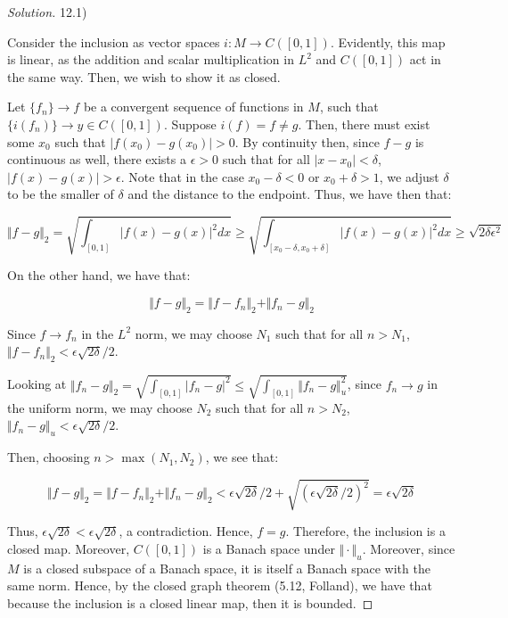 \documentclass[10pt]{article}
\begin{document}
\begin{proof}[Solution]

12.1)

Consider the inclusion as vector spaces $i: M \to C([0,1])$. Evidently, this map is linear, as the addition and scalar multiplication in $L^2$ and $C([0,1])$ act in the same way. Then, we wish to show it as closed.

Let $\{ f_n \} \to f$ be a convergent sequence of functions in $M$, such that $\{ i(f_n) \} \to y \in C([0,1])$. Suppose $i(f) = f \not = g$. Then, there must exist some $x_0$ such that $| f(x_0) - g(x_0) | > 0$. By continuity then, since $f - g$ is continuous as well, there exists a $\epsilon > 0$ such that for all $| x - x_0 | < \delta$, $|f(x) - g(x) | > \epsilon$. Note that in the case $x_0 - \delta < 0$ or $x_0 + \delta > 1$, we adjust $\delta$ to be the smaller of $\delta$ and the distance to the endpoint. Thus, we have then that:

$$ \Vert f - g \Vert_2  = \sqrt{\int_{[0,1]} | f(x) - g(x)|^2 dx} \geq \sqrt{ \int_{[x_0 - \delta, x_0 + \delta]} | f(x) - g(x) |^2 dx } \geq \sqrt{ 2 \delta \epsilon^2 } $$

On the other hand, we have that:

$$ \Vert f - g \Vert_2  = \Vert f - f_n \Vert_2 + \Vert f_n - g \Vert_2$$

Since $f \to f_n$ in the $L^2$ norm, we may choose $N_1$ such that for all $n > N_1$, $\Vert f - f_n\Vert_2 <  \epsilon\sqrt{2\delta}/2$.

Looking at $\Vert f_n - g \Vert_2 = \sqrt{\int_{[0,1]} | f_n - g |^2}  \leq \sqrt{\int_{[0,1]} \Vert f_n - g \Vert_u^2}$, since $f_n \to g$ in the uniform norm, we may choose $N_2$ such that for all $n > N_2$, $\Vert f_n - g \Vert_u < \epsilon \sqrt{2\delta}/2 $.

Then, choosing $n > \max(N_1, N_2)$, we see that:

$$ \Vert f - g \Vert_2  = \Vert f - f_n \Vert_2 + \Vert f_n - g \Vert_2  <  \epsilon\sqrt{2\delta}/2 + \sqrt{\left( \epsilon\sqrt{2\delta}/2\right)^2} = \epsilon \sqrt{2 \delta}$$

Thus, $\epsilon \sqrt{2 \delta} < \epsilon \sqrt{2 \delta}$, a contradiction. Hence, $f = g$. Therefore, the inclusion is a closed map. Moreover, $C([0,1])$ is a Banach space under $\Vert \cdot \Vert_u$. Moreover, since $M$ is a closed subspace of a Banach space, it is itself a Banach space with the same norm. Hence, by the closed graph theorem (5.12, Folland), we have that because the inclusion is a closed linear map, then it is bounded.


\end{proof}
\end{document}
